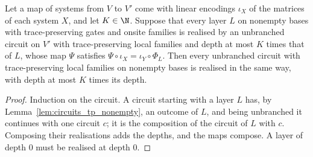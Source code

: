 \begin{theorem}
    \label{thm:circuits_substitute}
    \leanok
    Let a map of systems from $V$ to $V'$ come with linear encodings $\iota_X$ of the
    matrices of each system $X$, and let $K\in\N$. Suppose that every layer $L$ on
    nonempty bases with trace-preserving gates and onsite families is realised by an unbranched circuit on
    $V'$ with trace-preserving local families and depth at most $K$ times that of $L$,
    whose map $\Psi$ satisfies $\Psi\circ\iota_X=\iota_Y\circ\Phi_L$. Then every
    unbranched circuit with trace-preserving local families on nonempty bases is realised
    in the same way, with depth at most $K$ times its depth.
\end{theorem}
\begin{proof}\leanok
    Induction on the circuit. A circuit starting with a layer $L$ has, by
    Lemma~\ref{lem:circuits_tp_nonempty}, an outcome of $L$, and being unbranched it
    continues with one circuit $c$; it is the composition of the circuit of $L$ with $c$.
    Composing their realisations adds the depths, and the maps compose. A layer of depth
    $0$ must be realised at depth $0$.
\end{proof}

